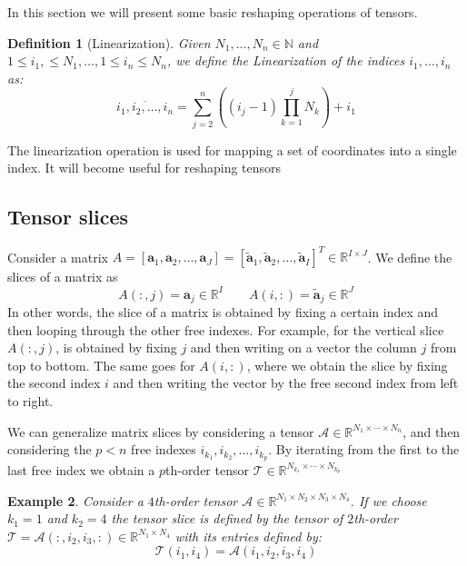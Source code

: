 \documentclass[11pt,a4paper,openright,oneside]{book}
\numberwithin{equation}{section}
\newtheorem{defn0}{Definition}[chapter]
\newtheorem{example0}[defn0]{Example}
\newenvironment{definition}{ \begin{defn0}}{\end{defn0}}
\newenvironment{example}{ \begin{example0}\rm}{\end{example0}}
\begin{document}
In this section we will present some basic reshaping operations of tensors.

\begin{definition}[Linearization]
    Given $N_1, \dots, N_n \in \mathbb{N}$ and $1 \leqslant i_1, \leqslant N_1, \dots, 1 \leqslant i_n \leqslant N_n$,
    we define the Linearization of the indices $i_1, \dots, i_n$ as:
    $$\overline {i_1, i_2, \dots, i_n} = \sum_{j=2}^{n} \left( (i_j - 1) \prod_{k=1}^j N_k \right) + i_1$$
\end{definition}

\noindent
The linearization operation is used for mapping a set of coordinates into a single index. It will become useful
for reshaping tensors

\subsection*{Tensor slices}
Consider a matrix $A = [\mathbf{a}_1, \mathbf{a}_2, \dots, \mathbf{a}_J] = [\mathbf{\tilde a}_1, \mathbf{\tilde a}_2, \dots, \mathbf{\tilde a}_I]^T \in \mathbb{R}^{I \times J}$. We define the slices of a matrix
as $$A(:, j) = \mathbf{a}_j \in \mathbb{R}^I \qquad A(i, :) = \mathbf{\tilde{a}}_j \in \mathbb{R}^J$$
In other words, the slice of a matrix is obtained by fixing a certain index and then looping through the other
free indexes. For example, for the vertical slice $A(:, j)$, is obtained by fixing $j$ and then writing on a vector
the column $j$ from top to bottom. The same goes for $A(i, :)$, where we obtain the slice by fixing the second
index $i$ and then writing the vector by the free second index from left to right.

We can generalize matrix slices by considering a tensor $\mathcal{A} \in \mathbb{R}^{N_1 \times \cdots \times N_n}$, and then
considering the $p < n$ free indexes $i_{k_1}, i_{k_2}, \dots, i_{k_p}$. By iterating from the first to the last free index
we obtain a $p$th-order tensor $\mathcal{T} \in \mathbb{R}^{N_{k_1} \times \cdots \times N_{k_p}}$

\begin{example}
    Consider a $4$th-order tensor $\mathcal{A} \in \mathbb{R}^{N_1 \times N_2 \times N_3 \times N_4}$. If we choose $k_1 = 1$ and
    $k_2 = 4$ the tensor slice is defined by the tensor of $2$th-order $\mathcal{T} = \mathcal{A}(:, i_2, i_3, :) \in \mathbb{R}^{N_1 \times N_4}$ with its entries defined by:
    $$\mathcal{T}(i_1, i_4) = \mathcal{A}(i_1, i_2, i_3, i_4)$$
\end{example}
\end{document}
